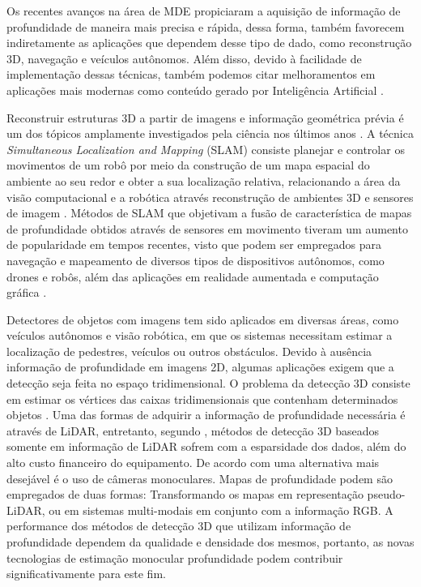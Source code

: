 Os recentes avanços na área de MDE propiciaram a aquisição de informação de profundidade de maneira mais precisa e rápida, dessa forma, também favorecem indiretamente as aplicações que dependem desse tipo de dado, como reconstrução 3D, navegação e veículos autônomos. Além disso, devido à facilidade de implementação dessas técnicas, também podemos citar melhoramentos em aplicações mais modernas como conteúdo gerado por Inteligência Artificial \cite{yang2024depth}.


Reconstruir estruturas 3D a partir de imagens e informação geométrica prévia é um dos tópicos amplamente investigados pela ciência nos últimos anos \cite{zhao2020monocular}. A técnica \textit{Simultaneous Localization and Mapping} (SLAM) consiste planejar e controlar os movimentos de um robô por meio da construção de um mapa espacial do ambiente ao seu redor e obter a sua localização relativa, relacionando a área da visão computacional e a robótica através reconstrução de ambientes 3D e sensores de imagem \cite{placed2023survey} \cite{stachniss2016simultaneous}. Métodos de SLAM que objetivam a fusão de característica de mapas de profundidade obtidos através de sensores em movimento tiveram um aumento de popularidade em tempos recentes, visto que podem ser empregados para navegação e mapeamento de diversos tipos de dispositivos autônomos, como drones e robôs, além das aplicações em realidade aumentada e computação gráfica \cite{tateno2017cnn}.


Detectores de objetos com imagens tem sido aplicados em diversas áreas, como veículos autônomos e visão robótica, em que os sistemas necessitam estimar a localização de pedestres, veículos ou outros obstáculos. Devido à ausência informação de profundidade em imagens 2D, algumas aplicações exigem que a detecção seja feita no espaço tridimensional. O problema da detecção 3D consiste em estimar os vértices das caixas tridimensionais que contenham determinados objetos \cite{hu2022detection}. Uma das formas de adquirir a informação de profundidade necessária é através de LiDAR, entretanto, segundo , métodos de detecção 3D baseados somente em informação de LiDAR sofrem com a esparsidade dos dados, além do alto custo financeiro do equipamento. De acordo com  uma alternativa mais desejável é o uso de câmeras monoculares. Mapas de profundidade podem são empregados de duas formas: Transformando os mapas em representação pseudo-LiDAR, ou em sistemas multi-modais em conjunto com a informação RGB. A performance dos métodos de detecção 3D que utilizam informação de profundidade dependem da qualidade e densidade dos mesmos, portanto, as novas tecnologias de estimação monocular profundidade podem contribuir significativamente para este fim.






